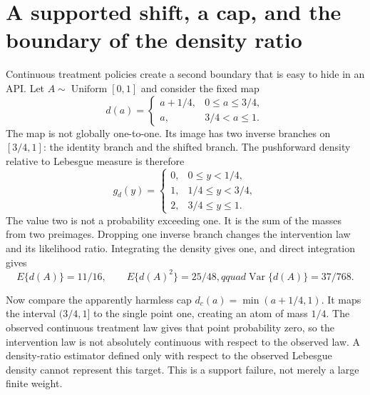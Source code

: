 \section{A supported shift, a cap, and the boundary of the density ratio}
\label{exec17:s5-pushforward}

Continuous treatment policies create a second boundary that is easy to hide in
an API. Let $A\sim\operatorname{Uniform}[0,1]$ and consider the fixed map
\begin{equation}
 d(a)=\begin{cases}a+1/4,&0\leq a\leq3/4,\\a,&3/4<a\leq1.\end{cases}
 \label{exec17:s5-shift}
\end{equation}
The map is not globally one-to-one. Its image has two inverse branches on
$[3/4,1]$: the identity branch and the shifted branch. The pushforward density
relative to Lebesgue measure is therefore
\begin{equation}
 g_d(y)=\begin{cases}
 0,&0\leq y<1/4,\\
 1,&1/4\leq y<3/4,\\
 2,&3/4\leq y\leq1.
 \end{cases}
 \label{exec17:s5-push-density}
\end{equation}
The value two is not a probability exceeding one. It is the sum of the masses
from two preimages. Dropping one inverse branch changes the intervention law
and its likelihood ratio. Integrating the density gives one, and direct
integration gives
\begin{equation}
 E\{d(A)\}=11/16,\qquad E\{d(A)^2\}=25/48,qquad
 \operatorname{Var}\{d(A)\}=37/768.
 \label{exec17:s5-push-moments}
\end{equation}

Now compare the apparently harmless cap $d_c(a)=\min(a+1/4,1)$. It maps the
interval $(3/4,1]$ to the single point one, creating an atom of mass $1/4$.
The observed continuous treatment law gives that point probability zero, so
the intervention law is not absolutely continuous with respect to the observed
law. A density-ratio estimator defined only with respect to the observed
Lebesgue density cannot represent this target. This is a support failure, not
merely a large finite weight.

